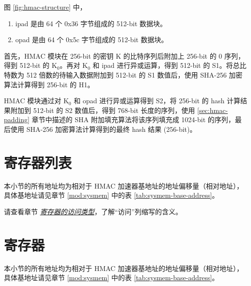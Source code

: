 \documentclass[main\_\_CN.tex]{subfiles}
\begin{document}
图 \ref{fig:hmac-structure} 中，
\begin{enumerate}
    \item ipad 是由 64 个 0x{}36 字节组成的 512-bit 数据块。
    \item opad 是由 64 个 0x{}5c 字节组成的 512-bit 数据块。
\end{enumerate}

\clearpage
首先，HMAC 模块在 256-bit 的密钥 K 的比特序列后附加上 256-bit 的 0 序列，得到 512-bit 的 K$_0$。再对 K$_0$ 和 ipad 进行异或运算，得到 512-bit 的 S1。将总比特数为 512 倍数的待输入数据附加到 512-bit 的 S1 数值后，使用 SHA-256 加密算法计算得到 256-bit 的 H1。

HMAC 模块通过对 K$_0$ 和 opad 进行异或运算得到 S2，将 256-bit 的 hash 计算结果附加到 512-bit 的 S2 数值后，得到 768-bit 长度的序列，使用 \ref{sec:hmac-padding} 章节中描述的 SHA 附加填充算法将该序列填充成 1024-bit 的序列，最后使用 SHA-256 加密算法计算得到的最终 hash 结果 (256-bit)。





\clearpage
\hypertarget{hmac-reg-summ}{}
\section{寄存器列表}
\label{sec:hmac-reg-summ}

本小节的所有地址均为相对于 HMAC 加速器基地址的地址偏移量（相对地址），具体基地址请见章节 \ref{mod:sysmem} \textit{} 中的表 \ref{tab:sysmem-base-address}。

请查看章节 \hyperref[glossary-access-types]{\textit{寄存器的访问类型}}，了解“访问”列缩写的含义。






\clearpage
\section{寄存器}

本小节的所有地址均为相对于 HMAC 加速器基地址的地址偏移量（相对地址），具体基地址请见章节 \ref{mod:sysmem} \textit{} 中的表 \ref{tab:sysmem-base-address}。


\end{document}
